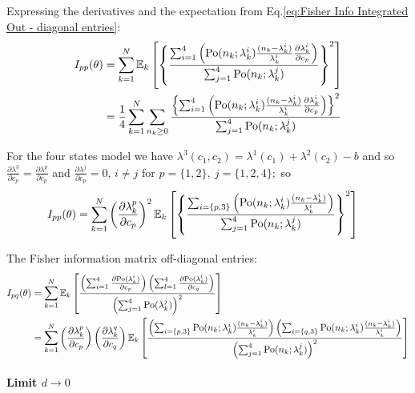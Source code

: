 Expressing the derivatives and the expectation from Eq.\eqref{eq:Fisher Info Integrated Out - diagonal entries}:
%
\begin{alignat*}{1}
	I_{pp}(\theta) & =\sum_{k=1}^N\mathbb{E}_k\left[\left\{ \frac{\sum_{i=1}^{4}\left(\mathrm{Po}(n_k;\lambda_k^i)\frac{(n_k-\lambda_k^i)}{\lambda_k^i}\frac{\partial\lambda_k^i}{\partial c_p}\right)}{\sum_{j=1}^{4}\mathrm{Po}(n_k;\lambda_k^j)}\right\} ^2\right]\\
 	& =\frac{1}{4}\sum_{k=1}^N\sum_{n_k\geq0}\frac{\left\{ \sum_{i=1}^{4}\left(\mathrm{Po}(n_k;\lambda_k^i)\frac{(n_k-\lambda_k^i)}{\lambda_k^i}\frac{\partial\lambda_k^i}{\partial c_p}\right)\right\} ^2}{\sum_{j=1}^{4}\mathrm{Po}(n_k;\lambda_k^j)}
\end{alignat*}

For the four states model we have $\lambda^{3}(c_1,c_2)=\lambda^1(c_1)+\lambda^2(c_2)-b$ and so $\frac{\partial\lambda^{3}}{\partial c_p}=\frac{\partial\lambda^p}{\partial c_p}$ and $\frac{\partial\lambda^j}{\partial c_p}=0,\, i\neq j$ for $p=\{1,2\},\: j=\{1,2,4\};$ so 
%
\begin{alignat*}{1}
	I_{pp}(\theta) & =\sum_{k=1}^N\left(\frac{\partial\lambda_k^p}{\partial c_p}\right)^2\mathbb{E}_k\left[\left\{ \frac{\sum_{i=\{p,3\}}\left(\mathrm{Po}(n_k;\lambda_k^i)\frac{(n_k-\lambda_k^i)}{\lambda_k^i}\right)}{\sum_{j=1}^{4}\mathrm{Po}(n_k;\lambda_k^j)}\right\} ^2\right]
\end{alignat*}


The Fisher information matrix off-diagonal entries:
%
\begin{alignat}{1}
	I_{pq}(\theta) 
	& =\sum_{k=1}^N\mathbb{E}_k\left[\frac{\left(\sum_{i=1}^{4}\frac{\partial\mathrm{Po}(\lambda_k^i)}{\partial c_p}\right)\left(\sum_{l=1}^{4}\frac{\partial\mathrm{Po}(\lambda_k^{l})}{\partial c_{q}}\right)}{\left(\sum_{j=1}^{4}\mathrm{Po}(\lambda_k^j)\right)^2}\right]\nonumber \\
 	& =\sum_{k=1}^N\left(\frac{\partial\lambda_k^p}{\partial c_p}\right)\left(\frac{\partial\lambda_k^q}{\partial c_{q}}\right)\mathbb{E}_k\left[\frac{\left(\sum_{i=\{p,3\}}\mathrm{Po}(n_k;\lambda_k^i)\frac{(n_k-\lambda_k^i)}{\lambda_k^i}\right)\left(\sum_{i=\{q,3\}}\mathrm{Po}(n_k;\lambda_k^i)\frac{(n_k-\lambda_k^i)}{\lambda_k^i}\right)}{\left(\sum_{j=1}^{4}\mathrm{Po}(n_k;\lambda_k^j)\right)^2}\right]
	\label{eq:Fisher Info Integrated Out-off diagonal entries}
\end{alignat}

\paragraph*{Limit $d\rightarrow0$}

